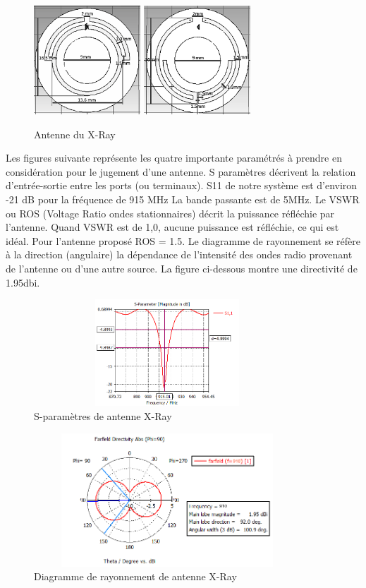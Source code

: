 \documentclass[11pt, a4paper, twoside]{book}
\begin{document}
\begin{figure}[H]
\centering
\includegraphics[width=4cm]{front11}
\includegraphics[width=4cm]{back22}
\caption{Antenne du X-Ray}
\end{figure}

Les figures suivante représente les quatre importante paramétrés à prendre en considération pour le jugement d'une antenne. S paramètres décrivent la relation d'entrée-sortie entre les ports (ou terminaux). S11 de notre système est d'environ -21 dB pour la fréquence de 915 MHz La bande passante est de 5MHz. Le VSWR ou ROS (Voltage Ratio ondes stationnaires) décrit la puissance réfléchie par l'antenne. Quand VSWR est de 1,0, aucune puissance est réfléchie, ce qui est idéal. Pour l'antenne proposé ROS = 1.5. Le diagramme de rayonnement se réfère à la direction (angulaire) la dépendance de l'intensité des ondes radio provenant de l'antenne ou d'une autre source. La figure ci-dessous montre une directivité de 1.95dbi.

\begin{figure}[H]
\centering
\includegraphics[width=10cm,height=4cm]{uses11}
\caption{S-paramètres de  antenne X-Ray}
\end{figure} 

\begin{figure}[H]
\centering
\includegraphics[width=10cm,height=5cm]{usefar}
\caption{Diagramme de rayonnement de antenne X-Ray}
\end{figure} 
\end{document}
